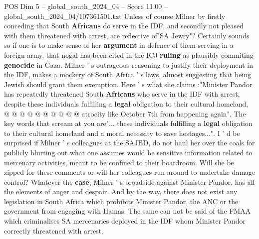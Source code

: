 \begin{textsample}{POS Dim 5 – global\_south\_2024\_04 – Score 11.00 – global\_south\_2024\_04/107361501.txt}
Unless of course Milner by firstly conceding that South \textbf{Africans} do serve in the IDF, and secondly not pleased with them threatened with arrest, are reflective of"SA Jewry"?
Certainly sounds so if one is to make sense of her \textbf{argument} in defence of them serving in a foreign army, that nogal has been cited in the ICJ \textbf{ruling} as plausibly commiting \textbf{genocide} in Gaza.
Milner ' s outrageous reasoning to justify their deployment in the IDF, makes a mockery of South Africa ' s laws, almost suggesting that being Jewish should grant them exemption.
Here ' s what she claims :"Minister Pandor has repeatedly threatened South \textbf{Africans} who serve in the IDF with arrest, despite these individuals fulfilling a \textbf{legal} obligation to their cultural homeland, @ @ @ @ @ @ @ @ @ @ atrocity like October 7th from happening again".
The key words that scream at you are"... these individuals fulfilling a \textbf{legal} obligation to their cultural homeland and a moral necessity to save hostages...".
I ' d be surprised if Milner ' s colleagues at the SAJBD, do not haul her over the coals for publicly blurting out what one assumes would be sensitive information related to mercenary activities, meant to be confined to their boardroom.
Will she be zipped for these comments or will her colleagues run around to undertake damage control?
Whatever the \textbf{case}, Milner ' s broadside against Minister Pandor, has all the elements of anger and despair.
And by the way, there does not exist any legislation in South Africa which prohibits Minister Pandor, the ANC or the government from engaging with Hamas.
The same can not be said of the FMAA which criminalises SA mercenaries deployed in the IDF whom Minister Pandor correctly threatened with arrest.

\end{textsample}
